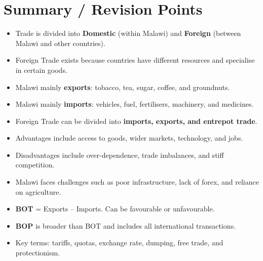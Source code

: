 \documentclass[12pt,a4paper, openany]{book}
\begin{document}
\section*{Summary / Revision Points}
\begin{itemize}
	\item Trade is divided into \textbf{Domestic} (within Malawi) and \textbf{Foreign} (between Malawi and other countries).
	\item Foreign Trade exists because countries have different resources and specialise in certain goods.
	\item Malawi mainly \textbf{exports}: tobacco, tea, sugar, coffee, and groundnuts.
	\item Malawi mainly \textbf{imports}: vehicles, fuel, fertilisers, machinery, and medicines.
	\item Foreign Trade can be divided into \textbf{imports, exports, and entrepot trade}.
	\item Advantages include access to goods, wider markets, technology, and jobs.
	\item Disadvantages include over-dependence, trade imbalances, and stiff competition.
	\item Malawi faces challenges such as poor infrastructure, lack of forex, and reliance on agriculture.
	\item \textbf{BOT} = Exports – Imports. Can be favourable or unfavourable.
	\item \textbf{BOP} is broader than BOT and includes all international transactions.
	\item Key terms: tariffs, quotas, exchange rate, dumping, free trade, and protectionism.
\end{itemize}



\backmatter

\nocite{*}
\printbibliography{}
\end{document}
